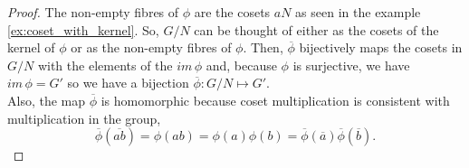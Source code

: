\documentclass[MathsNotesBase.tex]{subfiles}
\begin{document}
{	
	\begin{proof}
		The non-empty fibres of $\phi$ are the cosets $aN$ as seen in the example \ref{ex:coset_with_kernel}. So, $G/N$ can be thought of either as the cosets of the kernel of $\phi$ or as the non-empty fibres of $\phi$. Then, $\overline\phi$ bijectively maps the cosets in $G/N$ with the elements of the ${ im\,\phi }$ and, because $\phi$ is surjective, we have ${ im\,\phi = G' }$ so we have a bijection ${ \overline\phi: G/N \longmapsto G' }$.\\
		Also, the map $\overline\phi$ is homomorphic because coset multiplication is consistent with multiplication in the group,
		\[ \overline\phi(\overline{ab}) = \phi(ab) = \phi(a)\phi(b) = \overline\phi(\overline{a})\overline\phi(\overline{b}). \]
	\end{proof}

}
\end{document}
